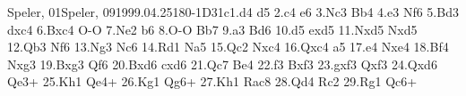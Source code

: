 \documentclass[twocolumn,a4paper,10pt]{report}
\begin{document}
\begin{chessgame}{Speler, 01}{Speler, 09}{1999.04.25}{18}{0-1}{D31c}{1.d4 d5 2.c4 e6 3.Nc3 Bb4 4.e3 Nf6 5.Bd3 dxc4 6.Bxc4 O-O 7.Ne2 b6 8.O-O Bb7 9.a3 Bd6 10.d5 exd5 11.Nxd5 Nxd5 12.Qb3 Nf6 13.Ng3 Nc6 14.Rd1 Na5 15.Qc2 Nxc4 16.Qxc4 a5 17.e4 Nxe4 18.Bf4 Nxg3 19.Bxg3 Qf6 20.Bxd6 cxd6 21.Qc7 Be4 22.f3 Bxf3 23.gxf3 Qxf3 24.Qxd6 Qe3+ 25.Kh1 Qe4+ 26.Kg1 Qg6+ 27.Kh1 Rac8 28.Qd4 Rc2 29.Rg1 Qc6+}\end{chessgame}
\end{document}
